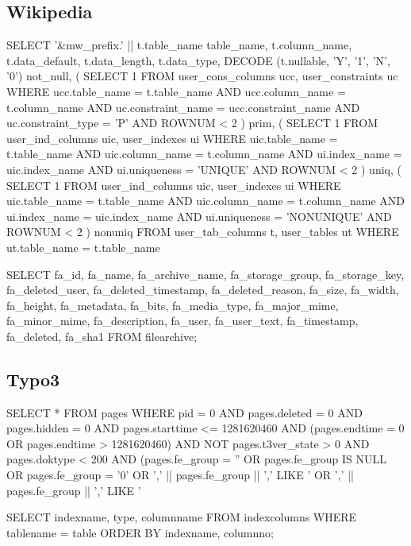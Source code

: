 \documentclass[11pt,a4paper]{globis-book}
\begin{document}
\subsection*{Wikipedia}
\begin{setq}
SELECT
  '&mw_prefix.' || t.table_name table_name,
  t.column_name,
  t.data_default,
  t.data_length,
  t.data_type,
  DECODE (t.nullable, 'Y', '1', 'N', '0') not_null,
  (
    SELECT 1
    FROM
      user_cons_columns ucc,
      user_constraints uc
    WHERE ucc.table_name = t.table_name
      AND ucc.column_name = t.column_name
      AND uc.constraint_name = ucc.constraint_name
      AND uc.constraint_type = 'P'
      AND ROWNUM < 2
  ) prim,
  (
    SELECT 1
    FROM
      user_ind_columns uic,
      user_indexes ui
    WHERE uic.table_name = t.table_name
      AND uic.column_name = t.column_name
      AND ui.index_name = uic.index_name
      AND ui.uniqueness = 'UNIQUE'
      AND ROWNUM < 2
  ) uniq,
  (
    SELECT 1
    FROM
      user_ind_columns uic,
      user_indexes ui
    WHERE uic.table_name = t.table_name
      AND uic.column_name = t.column_name
      AND ui.index_name = uic.index_name
      AND ui.uniqueness = 'NONUNIQUE'
      AND ROWNUM < 2
  ) nonuniq
FROM
  user_tab_columns t,
  user_tables ut
WHERE ut.table_name = t.table_name
\end{setq}
\begin{setq}
SELECT
  fa_id,
  fa_name,
  fa_archive_name,
  fa_storage_group,
  fa_storage_key,
  fa_deleted_user,
  fa_deleted_timestamp,
  fa_deleted_reason,
  fa_size,
  fa_width,
  fa_height,
  fa_metadata,
  fa_bits,
  fa_media_type,
  fa_major_mime,
  fa_minor_mime,
  fa_description,
  fa_user,
  fa_user_text,
  fa_timestamp,
  fa_deleted,
  fa_sha1
FROM
  filearchive;
\end{setq}

\subsection*{Typo3}
\begin{setq}
SELECT *
FROM pages
WHERE pid = 0 
  AND pages.deleted = 0 
  AND pages.hidden = 0 
  AND pages.starttime <= 1281620460 
  AND (pages.endtime = 0 
  OR pages.endtime > 1281620460) 
  AND NOT pages.t3ver_state > 0 
  AND pages.doktype < 200 
  AND (pages.fe_group = ''
  OR pages.fe_group IS NULL 
  OR pages.fe_group = '0' 
  OR ',' || pages.fe_group || ',' LIKE '%
  OR ',' || pages.fe_group || ',' LIKE '%
\end{setq}
\begin{setq}
SELECT
  indexname,
  type,
  columnname
FROM indexcolumns
WHERE tablename = table
ORDER BY indexname, columnno;
\end{setq}
\end{document}
